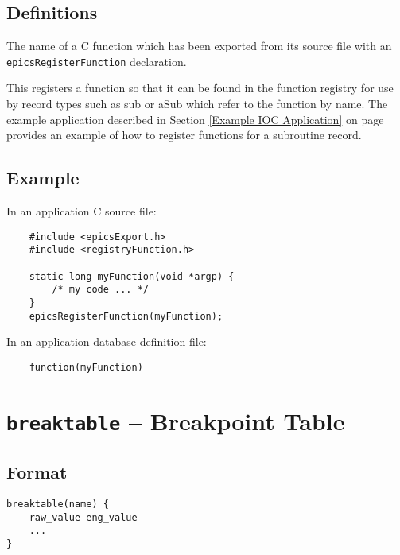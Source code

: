 \subsection{Definitions}

\begin{description}
\item [function\_name] The name of a C function which has been exported from its source file with an
\verb|epicsRegisterFunction| declaration.
\end{description}

This registers a function so that it can be found in the function registry for use by record types such as sub or aSub which 
refer to the function by name. The example application described in Section \ref{Example IOC Application} on page \pageref{Example IOC Application}
provides an example of how to register functions for a subroutine record.

\subsection{Example}

In an application C source file:

\begin{verbatim}
    #include <epicsExport.h>
    #include <registryFunction.h>

    static long myFunction(void *argp) {
        /* my code ... */
    }
    epicsRegisterFunction(myFunction);
\end{verbatim}

In an application database definition file:

\begin{verbatim}
    function(myFunction)
\end{verbatim}

\section{\texttt{breaktable} -- Breakpoint Table}

\subsection{Format}

\begin{verbatim}
breaktable(name) {
    raw_value eng_value
    ...
}
\end{verbatim}

